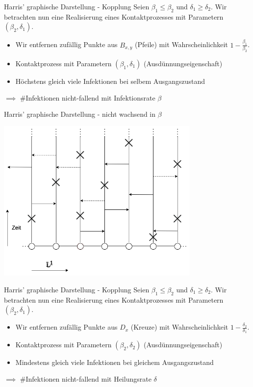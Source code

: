 \documentclass[11pt]{beamer}
\begin{document}
\begin{frame}{Harris' graphische Darstellung - Kopplung}
    Seien $\beta_1 \leq \beta_2$ und $\delta_1 \geq \delta_2$. Wir betrachten nun
    eine Realisierung eines Kontaktprozesses mit Parametern $(\beta_2, \delta_1)$.
    \begin{itemize}
        \item<2-> Wir entfernen zufällig Punkte aus $B_{x, y}$ (Pfeile) mit Wahrscheinlichkeit
        $1 - \frac{\beta_1}{\beta_2}$.
        \item<3-> Kontaktprozess mit Parametern $(\beta_1, \delta_1)$ (Ausdünnungseigenschaft)
        \item<4-> Höchstens gleich viele Infektionen bei selbem Ausgangszustand
    \end{itemize}
    $\implies$ \#Infektionen nicht-fallend mit Infektionsrate $\beta$
\end{frame}

\begin{frame}{Harris' graphische Darstellung - nicht wachsend in $\beta$}
    \begin{center}
        \includegraphics[width=0.75\textwidth]{images/contact process dotted arrows.png}
    \end{center}
\end{frame}

\begin{frame}{Harris' graphische Darstellung - Kopplung}
    Seien $\beta_1 \leq \beta_2$ und $\delta_1 \geq \delta_2$. Wir betrachten nun
    eine Realisierung eines Kontaktprozesses mit Parametern $(\beta_2, \delta_1)$.
    \begin{itemize}
        \item<2-> Wir entfernen zufällig Punkte aus $D_x$ (Kreuze) mit Wahrscheinlichkeit
        $1 - \frac{\delta_2}{\delta_1}$.
        \item<3-> Kontaktprozess mit Parametern $(\beta_2, \delta_2)$ (Ausdünnungseigenschaft)
        \item<4-> Mindestens gleich viele Infektionen bei gleichem Ausgangszustand
    \end{itemize}
    $\implies$ \#Infektionen nicht-fallend mit Heilungsrate $\delta$
\end{frame}
\end{document}
